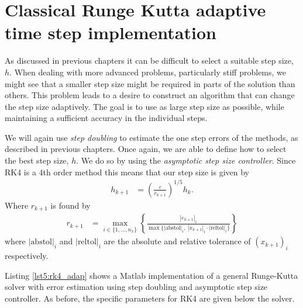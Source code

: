 \section{Classical Runge Kutta adaptive time step implementation}
As discussed in previous chapters it can be difficult to select a suitable step size, $h$. When dealing with more advanced problems, particularly stiff problems, we might see that a smaller step size might be required in parts of the solution than others. This problem leads to a desire to construct an algorithm that can change the step size adaptively. The goal is to use as large step size as possible, while maintaining a sufficient accuracy in the individual steps. 

We will again use \textit{step doubling} to estimate the one step errors of the methods, as described in previous chapters. Once again, we are able to define how to select the best step size, $h$. We do so by using the \textit{asymptotic step size controller}. Since RK4 is a 4th order method this means that our step size is given by
\begin{align}
    h_{k+1} &= \left(\frac{\varepsilon}{r_{k+1}} \right )^{1/5} h_k.
\end{align}
Where $r_{k+1}$ is found by
\begin{align}
    r_{k+1} &= \max_{i \in \{1,...,n_x\}} \left \{ \frac{|e_{k+1}|_i}{ \max \{ |\text{abstol}|_i, \ |x_{k+1}|_i \cdot |\text{reltol}|_i \} } \right \}
\end{align}
where $|\text{abstol}|_i$ and $|\text{reltol}|_i$ are the absolute and relative tolerance of $(x_{k+1})_i$ respectively.

Listing \ref{lst5:rk4_adap} shows a Matlab implementation of a general Runge-Kutta solver with error estimation using step doubling and asymptotic step size controller. As before, the specific parameters for RK4 are given below the solver. 


